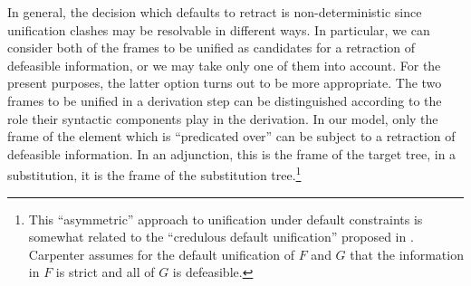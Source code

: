 \documentclass[output=paper,colorlinks,citecolor=brown,chinesefont]{langscibook}
\begin{document}
In general, the decision which defaults to retract is non-deterministic since unification clashes may be resolvable in different ways.
In particular, we can consider both of the frames to be unified as candidates for a retraction of defeasible information, or we may take only one of them into account.
For the present purposes, the latter option turns out to be more appropriate.
The two frames to be unified in a derivation step can be distinguished according to the role their syntactic components play in the derivation.
In our model, only the frame of the element which is ``predicated over'' can be subject to a retraction of defeasible information.
In an adjunction, this is the frame of the target tree, in a substitution, it is the frame of the substitution tree.\footnote{
This ``asymmetric'' approach to unification under default constraints is somewhat related to the ``credulous default unification'' proposed in \citet{carpenter1994skeptical}.
Carpenter assumes for the default unification of $F$ and $G$ that the information in $F$ is strict and all of $G$ is defeasible.}
%
\end{document}
